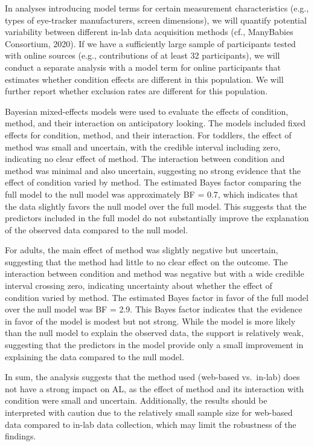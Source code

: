 \documentclass[
  man, donotrepeattitle,floatsintext]{apa6}
\begin{document}
In analyses introducing model terms for certain measurement characteristics (e.g., types of eye-tracker manufacturers, screen dimensions), we will quantify potential variability between different in-lab data acquisition methods (cf., ManyBabies Consortium, 2020). If we have a sufficiently large sample of participants tested with online sources (e.g., contributions of at least 32 participants), we will conduct a separate analysis with a model term for online participants that estimates whether condition effects are different in this population. We will further report whether exclusion rates are different for this population.

Bayesian mixed-effects models were used to evaluate the effects of condition, method, and their interaction on anticipatory looking. The models included fixed effects for condition, method, and their interaction. For toddlers, the effect of method was small and uncertain, with the credible interval including zero, indicating no clear effect of method. The interaction between condition and method was minimal and also uncertain, suggesting no strong evidence that the effect of condition varied by method. The estimated Bayes factor comparing the full model to the null model was approximately BF = 0.7, which indicates that the data slightly favors the null model over the full model. This suggests that the predictors included in the full model do not substantially improve the explanation of the observed data compared to the null model.

For adults, the main effect of method was slightly negative but uncertain, suggesting that the method had little to no clear effect on the outcome. The interaction between condition and method was negative but with a wide credible interval crossing zero, indicating uncertainty about whether the effect of condition varied by method. The estimated Bayes factor in favor of the full model over the null model was BF = 2.9. This Bayes factor indicates that the evidence in favor of the model is modest but not strong. While the model is more likely than the null model to explain the observed data, the support is relatively weak, suggesting that the predictors in the model provide only a small improvement in explaining the data compared to the null model.

In sum, the analysis suggests that the method used (web-based vs.~in-lab) does not have a strong impact on AL, as the effect of method and its interaction with condition were small and uncertain. Additionally, the results should be interpreted with caution due to the relatively small sample size for web-based data compared to in-lab data collection, which may limit the robustness of the findings.
\end{document}
